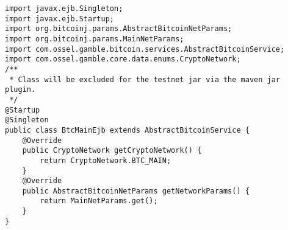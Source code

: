 \begin{lstlisting}[basicstyle=\small] %or \tiny or \small or \footnotesize etc.
import javax.ejb.Singleton;
import javax.ejb.Startup;
import org.bitcoinj.params.AbstractBitcoinNetParams;
import org.bitcoinj.params.MainNetParams;
import com.ossel.gamble.bitcoin.services.AbstractBitcoinService;
import com.ossel.gamble.core.data.enums.CryptoNetwork;
/**
 * Class will be excluded for the testnet jar via the maven jar plugin.
 */
@Startup
@Singleton
public class BtcMainEjb extends AbstractBitcoinService {
    @Override
    public CryptoNetwork getCryptoNetwork() {
        return CryptoNetwork.BTC_MAIN;
    }
    @Override
    public AbstractBitcoinNetParams getNetworkParams() {
        return MainNetParams.get();
    }
}
\end{lstlisting}

